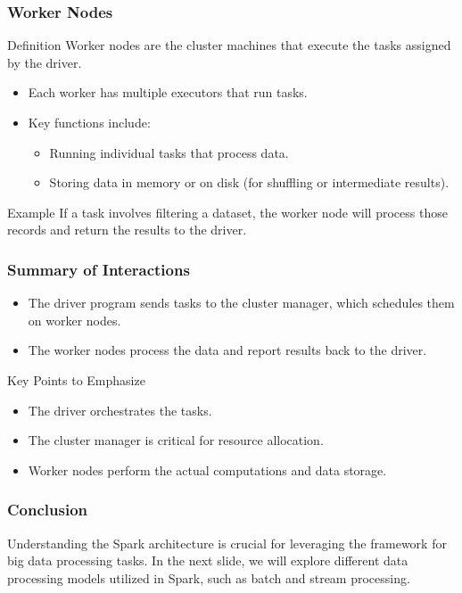 \documentclass[aspectratio=169]{beamer}
\begin{document}
\begin{frame}[fragile]
    \frametitle{Worker Nodes}
    \begin{block}{Definition}
        Worker nodes are the cluster machines that execute the tasks assigned by the driver.
    \end{block}
    \begin{itemize}
        \item Each worker has multiple executors that run tasks.
        \item Key functions include:
        \begin{itemize}
            \item Running individual tasks that process data.
            \item Storing data in memory or on disk (for shuffling or intermediate results).
        \end{itemize}
    \end{itemize}
    \begin{block}{Example}
        If a task involves filtering a dataset, the worker node will process those records and return the results to the driver.
    \end{block}
\end{frame}

\begin{frame}[fragile]
    \frametitle{Summary of Interactions}
    \begin{itemize}
        \item The driver program sends tasks to the cluster manager, which schedules them on worker nodes.
        \item The worker nodes process the data and report results back to the driver.
    \end{itemize}
    \begin{block}{Key Points to Emphasize}
        \begin{itemize}
            \item The driver orchestrates the tasks.
            \item The cluster manager is critical for resource allocation.
            \item Worker nodes perform the actual computations and data storage.
        \end{itemize}
    \end{block}
\end{frame}

\begin{frame}[fragile]
    \frametitle{Conclusion}
    Understanding the Spark architecture is crucial for leveraging the framework for big data processing tasks. In the next slide, we will explore different data processing models utilized in Spark, such as batch and stream processing.
\end{frame}
\end{document}
